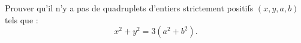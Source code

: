 Prouver qu'il n'y a pas de quadruplets d'entiers strictement positifs
$(x, y, a, b)$ tels que :
\[
x^2 + y^2 = 3(a^2 + b^2).
\]
